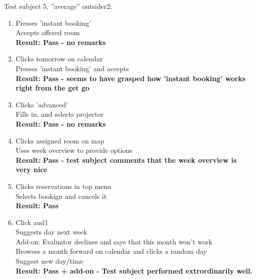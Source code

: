Test subject 5, ''average'' outsider2:
\begin{enumerate}
\item Presses 'instant booking' \\
Accepts offered room \\
\textbf{Result: Pass - no remarks}
\item Clicks tomorrow on calendar \\
Presses 'instant booking' and accepts \\
\textbf{Result: Pass - seems to have grasped how 'instant booking' works right from the get go}
\item Clicks 'advanced' \\
Fills in, and selects projector \\
\textbf{Result: Pass - no remarks}
\item Clicks assigned room on map \\
Uses week overview to provide options \\
\textbf{Result: Pass - test subject comments that the week overview is very nice}
\item Clicks reservations in top menu \\
Selects bookign and cancels it \\
\textbf{Result: Pass}
\item Click aud1 \\
Suggests day next week \\
Add-on: Evaluator declines and says that this month won't work \\
Browses a month forward on calendar and clicks a random day \\
Suggest new day/time \\
\textbf{Result: Pass + add-on - Test subject performed extrordinarily well.}
\end{enumerate}


